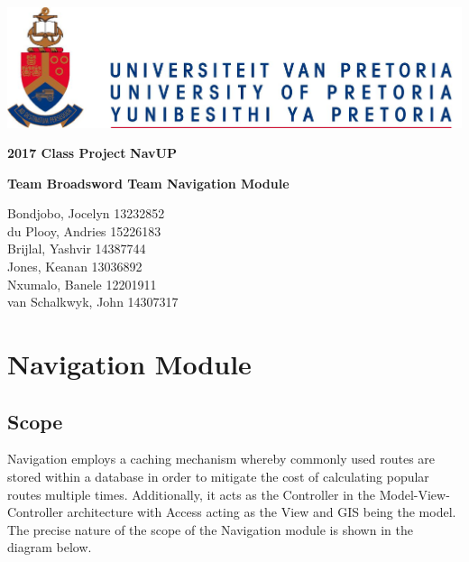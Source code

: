 \documentclass[12pt]{article}
\begin{document}
\begin{titlepage}
\begin{center}
\includegraphics[scale=1]{diagrams/up.png}
\\
\begin{huge}
\textbf{2017 Class Project}
\textbf{NavUP}\\
\end{huge}
\hfill \break
\begin{huge}
\begin{center}
\textbf{Team Broadsword Team Navigation Module}
\end{center}
\end{huge}
\hfill \break
\hfill \break
\begin{small}
	Bondjobo, Jocelyn 	13232852 \\
	du Plooy, Andries	15226183 \\
	Brijlal, Yashvir		14387744 \\
	Jones, Keanan		13036892 \\	
	Nxumalo, Banele		12201911 \\
	van Schalkwyk, John	14307317 \\
\end{small}

\end{center}
\end{titlepage}

\newpage
{}
\thispagestyle{empty}
\tableofcontents
\clearpage


\section{Navigation Module}
\subsection{Scope}
Navigation employs a caching mechanism whereby commonly used routes are stored within a database in order to mitigate the cost of calculating popular routes multiple times.  Additionally, it acts as the Controller in the Model-View-Controller architecture with Access acting as the View and GIS being the model.  The precise nature of the scope of the Navigation module is shown in the diagram below.
\end{document}
